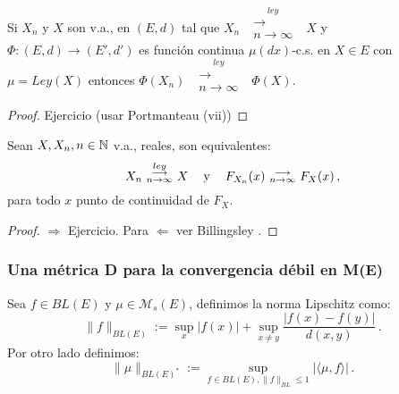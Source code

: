 \begin{theorem}
Si $X_n$ y $X$ son v.a., en $(E,d)$ tal que $X_n\mbox{ }\overset{ley}{\substack{\longrightarrow \\n \to \infty}}\mbox{ }X$ y $\Phi:(E,d)\longrightarrow (E',d')$ es función continua $\mu(dx)$-c.s. en $X\in E$ con $\mu=Ley(X)$ entonces $\Phi(X_n)\mbox{ }\overset{ley}{\substack{\longrightarrow \\n \to \infty}}\mbox{ }\Phi(X)$.
\end{theorem}
\begin{proof}
\color{blue}Ejercicio (usar Portmanteau (vii)) \color{black}
\end{proof}

\begin{proposition}
Sean $X,X_n,n\in\mathbb{N}$ v.a., reales, son equivalentes:
$$X_n\mbox{ }\overset{ley}{\substack{\longrightarrow \\n \to \infty}}\mbox{ }X \hspace{.25cm}\, \mbox{ y }\hspace{.25cm}\, F_{X_n}(x) \mbox{ }\substack{\longrightarrow \\ n\to\infty}\mbox{ } F_X(x)\, ,$$
para todo $x$ punto de continuidad de $F_X$.
\end{proposition}
\begin{proof}
\color{blue}$\Rightarrow$ Ejercicio. \gris Para $\Leftarrow$ ver Billingsley \cite{billing}. \negro
\end{proof}

\subsubsection{Una métrica D para la convergencia débil en M(E)}
\begin{definition}
Sea $f\in BL(E)$ y $\mu\in \mathcal{M}_s(E)$, definimos la norma Lipschitz como:
$$\displaystyle \|f\|_{BL(E)} := \sup_x|f(x)|+\sup_{x\neq y}\frac{|f(x)-f(y)|}{d(x,y)} \, .$$
Por otro lado definimos:
$$\|\mu\|_{BL(E)^*} := \displaystyle\sup_{f\in BL(E),\|f\|_{BL}\leq 1}|\langle \mu,f\rangle| \, .$$
\end{definition}

